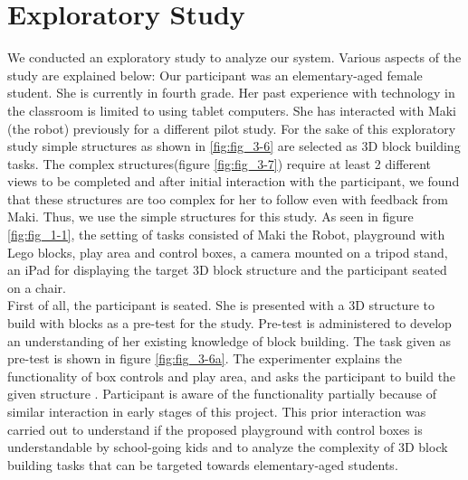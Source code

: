 \chapter{Exploratory Study}
\label{chap:four}


We conducted an exploratory study to analyze our system. Various aspects of the study are explained below:
Our participant was an elementary-aged female student. She is currently in fourth grade. Her past experience with technology in the classroom is limited to using tablet computers. She has interacted with Maki (the robot) previously for a different pilot study.
For the sake of this exploratory study simple structures as shown in \ref{fig:fig_3-6} are selected as 3D block building tasks. The complex structures(figure \ref{fig:fig_3-7}) require at least 2 different views to be completed and after initial interaction with the participant, we found that these structures are too complex for her to follow even with feedback from Maki. Thus, we use the simple structures for this study.
As seen in figure \ref{fig:fig_1-1}, the setting of tasks consisted of Maki the Robot, playground with Lego\textsuperscript\textregistered{} blocks, play area and control boxes, a camera mounted on a tripod stand, an iPad for displaying the target 3D block structure and the participant seated on a chair. \\
First of all, the participant is seated. She is presented with a 3D structure to build with blocks as a pre-test for the study. Pre-test is administered to develop an understanding of her existing knowledge of block building. The task given as pre-test is shown in figure \ref{fig:fig_3-6a}. The experimenter explains the functionality of box controls and play area, and asks the participant to build the given structure . Participant is aware of the functionality partially because of similar interaction in early stages of this project. This prior interaction was carried out to understand if the proposed playground with control boxes is understandable by school-going kids and to analyze the complexity of 3D block building tasks that can be targeted towards elementary-aged students. \\
